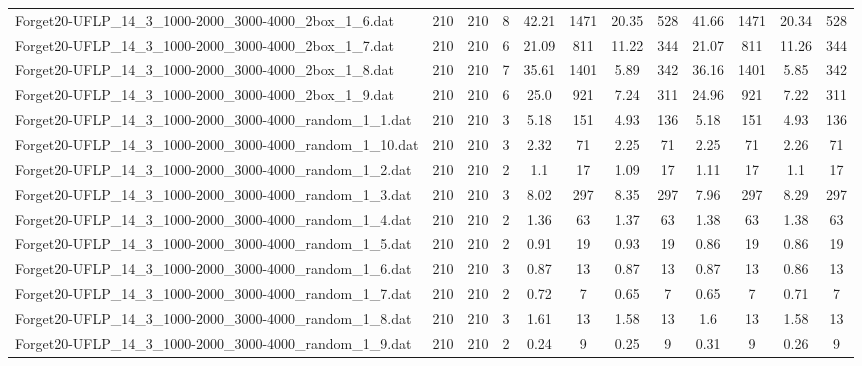 \begin{sidewaystable}[!ht]
{\begin{tabular}{lccccccccccc}
Forget20-UFLP\_14\_3\_1000-2000\_3000-4000\_2box\_1\_6.dat & 210 & 210 & 8 & 42.21 & 1471 & 20.35 & 528 & 41.66 & 1471 & 20.34 & 528 \\
Forget20-UFLP\_14\_3\_1000-2000\_3000-4000\_2box\_1\_7.dat & 210 & 210 & 6 & 21.09 & 811 &  \textcolor{blue2}{11.22} & 344 & 21.07 & 811 & 11.26 & 344 \\
Forget20-UFLP\_14\_3\_1000-2000\_3000-4000\_2box\_1\_8.dat & 210 & 210 & 7 & 35.61 & 1401 & 5.89 & 342 & 36.16 & 1401 &  \textcolor{blue2}{5.85} & 342 \\
Forget20-UFLP\_14\_3\_1000-2000\_3000-4000\_2box\_1\_9.dat & 210 & 210 & 6 & 25.0 & 921 & 7.24 & 311 & 24.96 & 921 &  \textcolor{blue2}{7.22} & 311 \\
Forget20-UFLP\_14\_3\_1000-2000\_3000-4000\_random\_1\_1.dat & 210 & 210 & 3 & 5.18 & 151 &  \textcolor{blue2}{4.93} & 136 & 5.18 & 151 &  \textcolor{blue2}{4.93} & 136 \\
Forget20-UFLP\_14\_3\_1000-2000\_3000-4000\_random\_1\_10.dat & 210 & 210 & 3 & 2.32 & 71 &  \textcolor{blue2}{2.25} & 71 &  \textcolor{blue2}{2.25} & 71 & 2.26 & 71 \\
Forget20-UFLP\_14\_3\_1000-2000\_3000-4000\_random\_1\_2.dat & 210 & 210 & 2 & 1.1 & 17 & 1.09 & 17 & 1.11 & 17 & 1.1 & 17 \\
Forget20-UFLP\_14\_3\_1000-2000\_3000-4000\_random\_1\_3.dat & 210 & 210 & 3 & 8.02 & 297 & 8.35 & 297 &  \textcolor{blue2}{7.96} & 297 & 8.29 & 297 \\
Forget20-UFLP\_14\_3\_1000-2000\_3000-4000\_random\_1\_4.dat & 210 & 210 & 2 &  \textcolor{blue2}{1.36} & 63 & 1.37 & 63 & 1.38 & 63 & 1.38 & 63 \\
Forget20-UFLP\_14\_3\_1000-2000\_3000-4000\_random\_1\_5.dat & 210 & 210 & 2 & 0.91 & 19 & 0.93 & 19 &  \textcolor{blue2}{0.86} & 19 &  \textcolor{blue2}{0.86} & 19 \\
Forget20-UFLP\_14\_3\_1000-2000\_3000-4000\_random\_1\_6.dat & 210 & 210 & 3 & 0.87 & 13 & 0.87 & 13 & 0.87 & 13 &  \textcolor{blue2}{0.86} & 13 \\
Forget20-UFLP\_14\_3\_1000-2000\_3000-4000\_random\_1\_7.dat & 210 & 210 & 2 & 0.72 & 7 &  \textcolor{blue2}{0.65} & 7 &  \textcolor{blue2}{0.65} & 7 & 0.71 & 7 \\
Forget20-UFLP\_14\_3\_1000-2000\_3000-4000\_random\_1\_8.dat & 210 & 210 & 3 & 1.61 & 13 &  \textcolor{blue2}{1.58} & 13 & 1.6 & 13 &  \textcolor{blue2}{1.58} & 13 \\
Forget20-UFLP\_14\_3\_1000-2000\_3000-4000\_random\_1\_9.dat & 210 & 210 & 2 &  \textcolor{blue2}{0.24} & 9 & 0.25 & 9 & 0.31 & 9 & 0.26 & 9 \\

\end{tabular}}
\end{sidewaystable}
